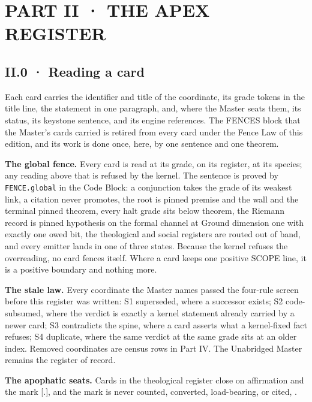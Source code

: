 \documentclass[10pt,twocolumn]{article}
\begin{document}
\hypertarget{part-ii-the-apex-register}{%
\section{PART II · THE APEX REGISTER}\label{part-ii-the-apex-register}}

\hypertarget{ii.0-reading-a-card}{%
\subsection{II.0 · Reading a card}\label{ii.0-reading-a-card}}

Each card carries the identifier and title of the coordinate, its grade
tokens in the title line, the statement in one paragraph, and, where the
Master seats them, its status, its keystone sentence, and its engine
references. The FENCES block that the Master's cards carried is retired
from every card under the Fence Law of this edition, and its work is
done once, here, by one sentence and one theorem.

\textbf{The global fence.} Every card is read at its grade, on its
register, at its species; any reading above that is refused by the
kernel. The sentence is proved by \texttt{FENCE.global} in the Code
Block: a conjunction takes the grade of its weakest link, a citation
never promotes, the root is pinned premise and the wall and the terminal
pinned theorem, every halt grade sits below theorem, the Riemann record
is pinned hypothesis on the formal channel at Ground dimension one with
exactly one owed bit, the theological and social registers are routed
out of band, and every emitter lands in one of three states. Because the
kernel refuses the overreading, no card fences itself. Where a card
keeps one positive SCOPE line, it is a positive boundary and nothing
more.

\textbf{The stale law.} Every coordinate the Master names passed the
four-rule screen before this register was written: S1 superseded, where
a successor exists; S2 code-subsumed, where the verdict is exactly a
kernel statement already carried by a newer card; S3 contradicts the
spine, where a card asserts what a kernel-fixed fact refuses; S4
duplicate, where the same verdict at the same grade sits at an older
index. Removed coordinates are census rows in Part IV. The Unabridged
Master remains the register of record.

\textbf{The apophatic seats.} Cards in the theological register close on
affirmation and the mark {[}.{]}, and the mark is never counted,
converted, load-bearing, or cited,
\texttt{}.
\end{document}
